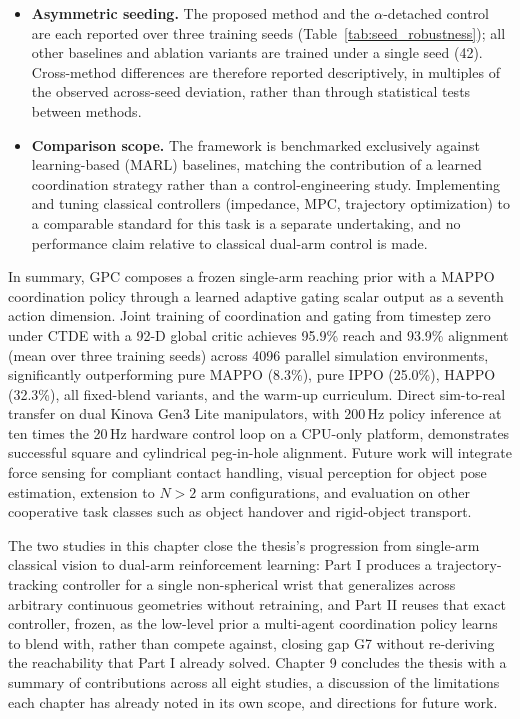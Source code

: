 \begin{itemize}
configuration of Table~\ref{tab:alpha_hyper}, as is common practice in recent MARL benchmarking, which
typically employs per-algorithm, per-task hyperparameter search~\citep{xie2026multi}. This avoids
favouring any single method through selective tuning, but the reported baseline performance may not
reflect each algorithm's individually optimal configuration; the training cost per run made an
independent per-algorithm search infeasible within the scope of this work.
\item \textbf{Asymmetric seeding.} The proposed method and the $\alpha$-detached control are each
reported over three training seeds (Table~\ref{tab:seed_robustness}); all other baselines and ablation
variants are trained under a single seed (42). Cross-method differences are therefore reported
descriptively, in multiples of the observed across-seed deviation, rather than through statistical
tests between methods.
\item \textbf{Comparison scope.} The framework is benchmarked exclusively against learning-based
(MARL) baselines, matching the contribution of a learned coordination strategy rather than a
control-engineering study. Implementing and tuning classical controllers (impedance, MPC, trajectory
optimization) to a comparable standard for this task is a separate undertaking, and no performance
claim relative to classical dual-arm control is made.
\end{itemize}

In summary, GPC composes a frozen single-arm reaching prior with a MAPPO coordination policy through
a learned adaptive gating scalar output as a seventh action dimension. Joint training of
coordination and gating from timestep zero under CTDE with a 92-D global critic achieves 95.9\%
reach and 93.9\% alignment (mean over three training seeds) across 4096 parallel simulation
environments, significantly outperforming pure MAPPO (8.3\%), pure IPPO (25.0\%), HAPPO (32.3\%), all
fixed-blend variants, and the warm-up curriculum. Direct sim-to-real transfer on dual Kinova Gen3 Lite
manipulators, with 200\,Hz policy inference at ten times the 20\,Hz hardware control loop on a
CPU-only platform, demonstrates successful square and cylindrical peg-in-hole alignment. Future work
will integrate force sensing for compliant contact handling, visual perception for object pose
estimation, extension to $N > 2$ arm configurations, and evaluation on other cooperative task classes
such as object handover and rigid-object transport.

The two studies in this chapter close the thesis's progression from single-arm classical vision to
dual-arm reinforcement learning: Part I produces a trajectory-tracking controller for a single
non-spherical wrist that generalizes across arbitrary continuous geometries without retraining, and
Part II reuses that exact controller, frozen, as the low-level prior a multi-agent coordination
policy learns to blend with, rather than compete against, closing gap G7 without re-deriving the
reachability that Part I already solved. Chapter 9 concludes the thesis with a summary of
contributions across all eight studies, a discussion of the limitations each chapter has already
noted in its own scope, and directions for future work.
